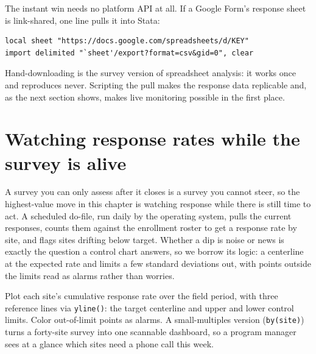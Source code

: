 \documentclass[
    a4paper,
    fontsize=10pt,
    twoside=true,
    numbers=noenddot,
]{kaobook}
\newenvironment{vizcallout}[1][Visualization to build]{%
    \begin{vizbox}[frametitle={#1}]%
}{%
    \end{vizbox}%
}
\begin{document}
The instant win needs no platform API at all. If a Google Form's response sheet is link-shared, one line pulls it into Stata:
{\footnotesize
\begin{verbatim}
local sheet "https://docs.google.com/spreadsheets/d/KEY"
import delimited "`sheet'/export?format=csv&gid=0", clear
\end{verbatim}
}
Hand-downloading is the survey version of spreadsheet analysis: it works once and reproduces never. Scripting the pull makes the response data replicable and, as the next section shows, makes live monitoring possible in the first place.

\section{Watching response rates while the survey is alive}\label{sec:monitor}
A survey you can only assess after it closes is a survey you cannot steer, so the highest-value move in this chapter is watching response while there is still time to act. A scheduled do-file, run daily by the operating system, pulls the current responses, counts them against the enrollment roster to get a response rate by site, and flags sites drifting below target. Whether a dip is noise or news is exactly the question a control chart answers, so we borrow its logic: a centerline at the expected rate and limits a few standard deviations out, with points outside the limits read as alarms rather than worries.

\begin{vizcallout}[Visualization to build: the response-rate control chart]
Plot each site's cumulative response rate over the field period, with three reference lines via \texttt{yline()}: the target centerline and upper and lower control limits. Color out-of-limit points as alarms. A small-multiples version (\texttt{by(site)}) turns a forty-site survey into one scannable dashboard, so a program manager sees at a glance which sites need a phone call this week.
\end{vizcallout}
\end{document}
